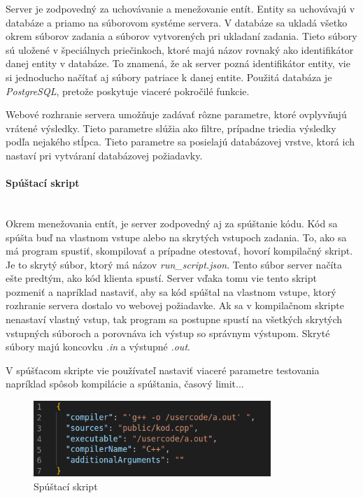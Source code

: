 Server je zodpovedný za uchovávanie a menežovanie entít. Entity sa uchovávajú v
databáze a priamo na súborovom systéme servera. V databáze sa ukladá všetko okrem súborov
zadania a súborov vytvorených pri ukladaní zadania. Tieto súbory sú uložené v špeciálnych
priečinkoch, ktoré majú názov rovnaký ako identifikátor danej entity v databáze. To znamená, že
ak server pozná identifikátor entity, vie si jednoducho načítať aj súbory patriace k danej entite.
Použitá databáza je \textit{PostgreSQL}, pretože poskytuje viaceré pokročilé funkcie.

Webové rozhranie servera umožňuje zadávať rôzne parametre, ktoré ovplyvňujú vrátené výsledky. Tieto
parametre slúžia ako filtre, prípadne triedia výsledky podľa nejakého stĺpca. Tieto parametre sa
posielajú databázovej vrstve, ktorá ich nastaví pri vytváraní databázovej požiadavky.

\paragraph{Spúštací skript}\leavevmode\\
Okrem menežovania entít, je server zodpovedný aj za spúštanie kódu. Kód sa spúšta buď na vlastnom
vstupe alebo na skrytých vstupoch zadania. To, ako sa má program spustiť, skompilovať a prípadne
otestovať, hovorí kompilačný skript. Je to skrytý súbor, ktorý má názov
\textit{run\_script.json}. Tento súbor server načíta ešte predtým, ako kód klienta spustí. Server
vďaka tomu vie tento skript pozmeniť a napríklad nastaviť, aby sa kód spúštal na vlastnom vstupe,
ktorý rozhranie servera dostalo vo webovej požiadavke. Ak sa v kompilačnom skripte nenastaví
vlastný vstup, tak program sa postupne spustí na všetkých skrytých vstupných súboroch a porovnáva
ich výstup so správnym výstupom. Skryté súbory majú koncovku \textit{.in} a výstupné \textit{.out}.

V spúšťacom skripte vie používateľ nastaviť viaceré parametre testovania napríklad spôsob
kompilácie a spúštania, časový limit...
\begin{figure}[H]
\centerline{\includegraphics[width=0.8\textwidth]{images/spustaci_skript}}
\caption[Spúštací skript]{Spúštací skript}
\label{obr:zadania}
\end{figure}

